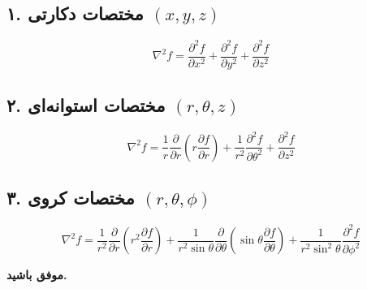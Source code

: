 \documentclass[a4paper,16pt]{article}
\begin{document}
	\subsection*{۱. مختصات دکارتی $(x, y, z)$}
	\[
	\nabla^2 f =
	\frac{\partial^2 f}{\partial x^2} +
	\frac{\partial^2 f}{\partial y^2} +
	\frac{\partial^2 f}{\partial z^2}
	\]
	
	\subsection*{۲. مختصات استوانه‌ای $(r, \theta, z)$}
	\[
	\nabla^2 f =
	\frac{1}{r} \frac{\partial}{\partial r}
	\left( r \frac{\partial f}{\partial r} \right)
	+ \frac{1}{r^2} \frac{\partial^2 f}{\partial \theta^2}
	+ \frac{\partial^2 f}{\partial z^2}
	\]
	
	\subsection*{۳. مختصات کروی $(r, \theta, \phi)$}
	\[
	\nabla^2 f =
	\frac{1}{r^2} \frac{\partial}{\partial r}
	\left( r^2 \frac{\partial f}{\partial r} \right)
	+ \frac{1}{r^2 \sin\theta} \frac{\partial}{\partial \theta}
	\left( \sin\theta \frac{\partial f}{\partial \theta} \right)
	+ \frac{1}{r^2 \sin^2\theta}
	\frac{\partial^2 f}{\partial \phi^2}
	\]
	






\vspace{10pt}
\textbf{موفق باشید.}
	
\end{document}
